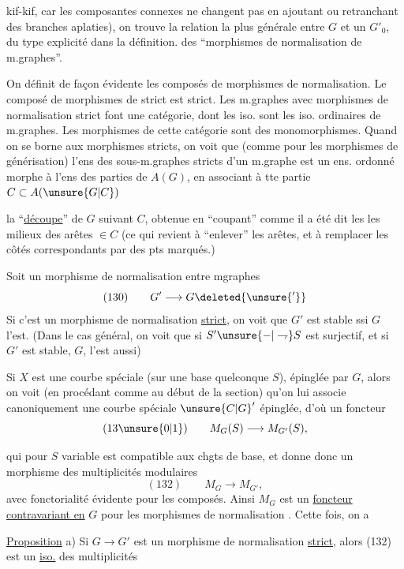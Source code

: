 kif-kif, car les composantes connexes ne changent pas en ajoutant ou retranchant des branches aplaties), on trouve la relation la plus générale entre $G$ et un $G'_0$, du type explicité dans la définition. des ``morphismes de normalisation de m.graphes''.

On définit de façon évidente les composés de morphismes de normalisation. Le composé de morphismes de  strict est strict. Les m.graphes avec morphismes de normalisation strict font une catégorie, dont les iso. sont les iso. ordinaires de m.graphes. Les morphismes de cette catégorie sont des monomorphismes. Quand on se borne aux morphismes  stricts, on voit que (comme pour les morphismes de générisation) l'ens des sous-m.graphes stricts d'un m.graphe  est un ens. ordonné morphe à l'ens des parties de $A(G)$, en associant à tte partie $C\subset A(\unsure{G|C})$

la ``\uline{découpe}'' de $G$ suivant $C$, obtenue en ``coupant'' comme il a été dit les les milieux des arêtes $\in C$ (ce qui revient à ``enlever'' les arêtes, et à remplacer les côtés correspondants par des pts marqués.)

Soit un morphisme de normalisation entre mgraphes
\[
(130)\qquad G'\longrightarrow G\deleted{\unsure{'}}
\]
Si c'est un morphisme de normalisation \uline{strict}, on voit que $G'$ est stable ssi $G$ l'est. (Dans le cas général, on voit que si $S'\unsure{-|\rightharpoondown}S$ est surjectif, et si $G'$ est stable, $G$, l'est aussi)

 Si $X$ est une courbe spéciale (sur une base quelconque $S$), épinglée par $G$, alors on voit (en procédant comme au début de la section) qu'on lui associe canoniquement une courbe spéciale $\unsure{C|G}'$ épinglée, d'où un foncteur
\[
(13\unsure{0|1})\qquad M_G(S)\longrightarrow M_{G'}(S),
\]

qui pour $S$ variable est compatible aux chgts de base, et donne donc un morphisme des multiplicités modulaires 
\[
(132)\qquad M_G\longrightarrow M_{G'},
\]
avec fonctorialité évidente pour les composés. Ainsi $M_G$ est un \uline{foncteur contravariant en} $G$ pour les morphismes de normalisation . Cette fois, on a

\uline{Proposition} a) Si $G\longrightarrow G'$ est un morphisme de normalisation \uline{strict}, alors (132) est un \uline{iso.} des multiplicités

